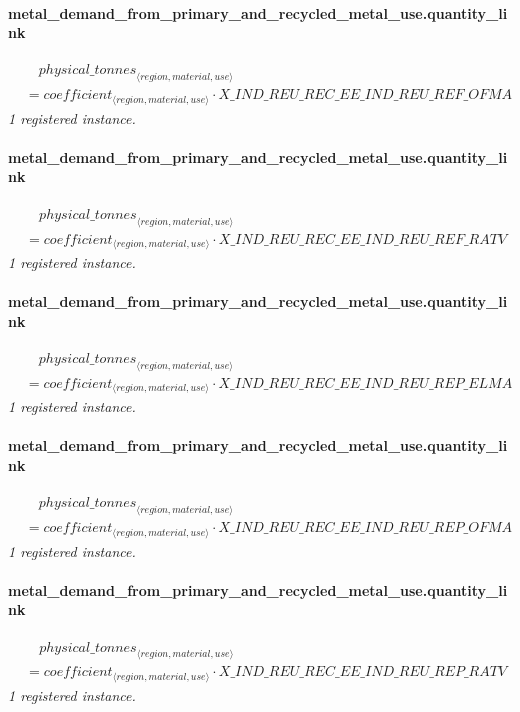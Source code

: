 \documentclass[11pt]{article}
\begin{document}
\paragraph{metal\_demand\_from\_primary\_and\_recycled\_metal\_use.quantity\_link}
\begin{align*}
&\quad {physical\_tonnes}_{\langle region, material, use\rangle}\\
&= coefficient_{\langle region, material, use\rangle} \cdot X\_IND\_REU\_REC\_EE\_IND\_REU\_REF\_OFMA
\end{align*}
\noindent\emph{1 registered instance.}\par
\paragraph{metal\_demand\_from\_primary\_and\_recycled\_metal\_use.quantity\_link}
\begin{align*}
&\quad {physical\_tonnes}_{\langle region, material, use\rangle}\\
&= coefficient_{\langle region, material, use\rangle} \cdot X\_IND\_REU\_REC\_EE\_IND\_REU\_REF\_RATV
\end{align*}
\noindent\emph{1 registered instance.}\par
\paragraph{metal\_demand\_from\_primary\_and\_recycled\_metal\_use.quantity\_link}
\begin{align*}
&\quad {physical\_tonnes}_{\langle region, material, use\rangle}\\
&= coefficient_{\langle region, material, use\rangle} \cdot X\_IND\_REU\_REC\_EE\_IND\_REU\_REP\_ELMA
\end{align*}
\noindent\emph{1 registered instance.}\par
\paragraph{metal\_demand\_from\_primary\_and\_recycled\_metal\_use.quantity\_link}
\begin{align*}
&\quad {physical\_tonnes}_{\langle region, material, use\rangle}\\
&= coefficient_{\langle region, material, use\rangle} \cdot X\_IND\_REU\_REC\_EE\_IND\_REU\_REP\_OFMA
\end{align*}
\noindent\emph{1 registered instance.}\par
\paragraph{metal\_demand\_from\_primary\_and\_recycled\_metal\_use.quantity\_link}
\begin{align*}
&\quad {physical\_tonnes}_{\langle region, material, use\rangle}\\
&= coefficient_{\langle region, material, use\rangle} \cdot X\_IND\_REU\_REC\_EE\_IND\_REU\_REP\_RATV
\end{align*}
\noindent\emph{1 registered instance.}\par
\end{document}
